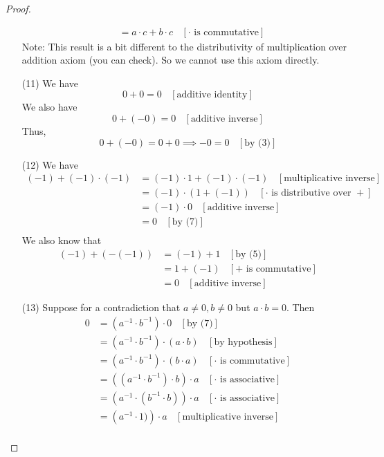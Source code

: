 \documentclass{book}
\begin{document}
\begin{proof}
\begin{itemize}[itemsep = 0pt]
\begin{align*}
            & = a \cdot c + b \cdot c \ \ \ \ [\cdot \text{ is commutative}] 
        \end{align*}
        Note: This result is a bit different to the distributivity of multiplication over addition axiom (you can check). So we cannot use this axiom directly.
        \item[(11)] We have
        $$0 + 0 = 0 \ \ \ \ [\text{additive identity}]$$
        We also have
        $$0 + (-0) = 0 \ \ \ \ [\text{additive inverse}]$$
        Thus,
        $$0 + (-0) = 0 + 0 \implies -0 = 0 \ \ \ \ [\text{by (3)}]$$
        \item[(12)] We have
        \begin{align*}
            (-1) + (-1) \cdot (-1) & = (-1) \cdot 1 + (-1) \cdot (-1) \ \ \ \ [\text{multiplicative inverse}] \\
            & = (-1) \cdot (1 + (-1)) \ \ \ \ [\cdot \text{ is distributive over } +] \\
            & = (-1) \cdot 0 \ \ \ \ [\text{additive inverse}] \\
            & = 0 \ \ \ \ [\text{by (7)}] \\
        \end{align*}
        We also know that
        \begin{align*}
            (-1) + (-(-1)) & = (-1) + 1 \ \ \ \ [\text{by (5)}] \\
            & = 1 + (-1) \ \ \ \ [+ \text{ is commutative}] \\
            & = 0 \ \ \ \ [\text{additive inverse}]
        \end{align*}
        \item[(13)] Suppose for a contradiction that $a \neq 0, b \neq 0$ but $a \cdot b = 0$. Then
        \begin{align*}
            0 & = (a^{-1} \cdot b^{-1}) \cdot 0 \ \ \ \ [\text{by (7)}] \\
            & = (a^{-1} \cdot b^{-1}) \cdot (a \cdot b) \ \ \ \ [\text{by hypothesis}] \\
            & = (a^{-1} \cdot b^{-1}) \cdot (b \cdot a) \ \ \ \ [\cdot \text{ is commutative}] \\
            & = \left( (a^{-1} \cdot b^{-1}) \cdot b \right) \cdot a \ \ \ \ [\cdot \text{ is associative}] \\
            & = \left( a^{-1} \cdot (b^{-1} \cdot b) \right) \cdot a \ \ \ \ [\cdot \text{ is associative}] \\
            & = \left( a^{-1} \cdot 1) \right) \cdot a \ \ \ \ [\text{multiplicative inverse}] \\

\end{align*}
\end{itemize}
\end{proof}
\end{document}
